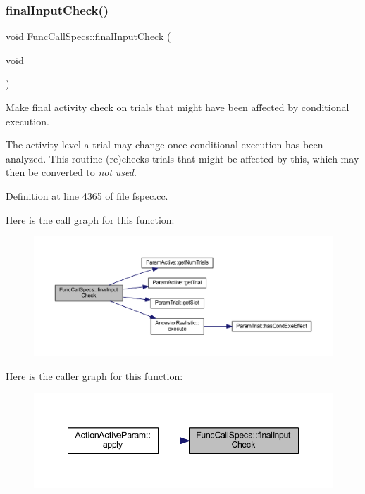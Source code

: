 \subsubsection{\texorpdfstring{finalInputCheck()}{finalInputCheck()}}
{\footnotesize\ttfamily void Func\+Call\+Specs\+::final\+Input\+Check (\begin{DoxyParamCaption}\item[{void}]{ }\end{DoxyParamCaption})}



Make final activity check on trials that might have been affected by conditional execution. 

The activity level a trial may change once conditional execution has been analyzed. This routine (re)checks trials that might be affected by this, which may then be converted to {\itshape not} {\itshape used}. 

Definition at line 4365 of file fspec.\+cc.

Here is the call graph for this function\+:
\nopagebreak
\begin{figure}[H]
\begin{center}
\leavevmode
\includegraphics[width=350pt]{class_func_call_specs_a48998cb808c1feedcad257f0984317ed_cgraph}
\end{center}
\end{figure}
Here is the caller graph for this function\+:
\nopagebreak
\begin{figure}[H]
\begin{center}
\leavevmode
\includegraphics[width=348pt]{class_func_call_specs_a48998cb808c1feedcad257f0984317ed_icgraph}
\end{center}
\end{figure}
\mbox{\label{class_func_call_specs_a9a59b9321b66bc9f23e69d2ef729258c}} 
